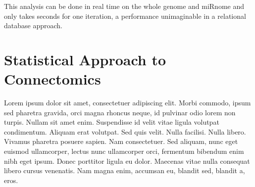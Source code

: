 This analysis can be done in real time on the whole genome and miRnome and only takes seconds for one iteration, a performance unimaginable in a relational database approach.

\section{Statistical Approach to Connectomics}


Lorem ipsum dolor sit amet, consectetuer adipiscing elit. Morbi commodo, ipsum sed pharetra gravida, orci magna rhoncus neque, id pulvinar odio lorem non turpis. Nullam sit amet enim. Suspendisse id velit vitae ligula volutpat condimentum. Aliquam erat volutpat. Sed quis velit. Nulla facilisi. Nulla libero. Vivamus pharetra posuere sapien. Nam consectetuer. Sed aliquam, nunc eget euismod ullamcorper, lectus nunc ullamcorper orci, fermentum bibendum enim nibh eget ipsum. Donec porttitor ligula eu dolor. Maecenas vitae nulla consequat libero cursus venenatis. Nam magna enim, accumsan eu, blandit sed, blandit a, eros.

